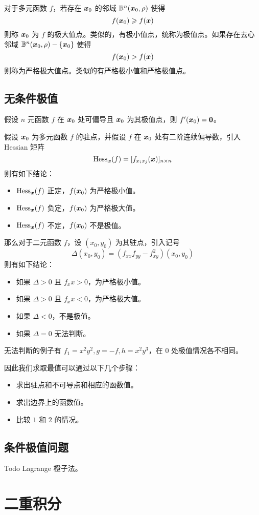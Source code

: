 对于多元函数 $f$，若存在 $\boldsymbol{x}_0$ 的邻域 $\mathbb{B}^n(\boldsymbol{x}_0, \rho)$ 使得
\[ f(\boldsymbol{x}_0) \geqslant f(\boldsymbol{x}) \]
则称 $\boldsymbol{x}_0$ 为 $f$ 的极大值点。类似的，有极小值点，统称为极值点。如果存在去心邻域 $\mathbb{B}^n(\boldsymbol{x}_0, \rho) - \{\boldsymbol{x}_0\}$ 使得
\[ f(\boldsymbol{x}_0) > f(\boldsymbol{x}) \]
则称为严格极大值点。类似的有严格极小值和严格极值点。

\subsection{无条件极值}

\begin{theorem}
	假设 $n$ 元函数 $f$ 在 $\boldsymbol{x}_0$ 处可偏导且 $\boldsymbol{x}_0$ 为其极值点，则 $f'(\boldsymbol{x}_0) = \boldsymbol{0}$。
\end{theorem}

\begin{theorem}
	假设 $\boldsymbol{x}_0$ 为多元函数 $f$ 的驻点，并假设 $f$ 在 $\boldsymbol{x}_0$ 处有二阶连续偏导数，引入 Hessian 矩阵
	\[ \operatorname{Hess}_{\boldsymbol{x}}(f) = [f_{x_i x_j}(\boldsymbol{x})]_{n \times n} \]
	则有如下结论：
	\begin{itemize}
		\item $\operatorname{Hess}_{\boldsymbol{x}}(f)$ 正定，$f(\boldsymbol{x}_0)$ 为严格极小值。
		\item $\operatorname{Hess}_{\boldsymbol{x}}(f)$ 负定，$f(\boldsymbol{x}_0)$ 为严格极大值。
		\item $\operatorname{Hess}_{\boldsymbol{x}}(f)$ 不定，$f(\boldsymbol{x}_0)$ 不是极值。
	\end{itemize}
\end{theorem}

那么对于二元函数 $f$，设 $(x_0, y_0)$ 为其驻点，引入记号
\[ \Delta(x_0, y_0) = (f_{xx} f_{yy} - f_{xy}^2)(x_0, y_0) \]
则有如下结论：
\begin{itemize}
	\item 如果 $\Delta > 0$ 且 $f_xx > 0$，为严格极小值。
	\item 如果 $\Delta > 0$ 且 $f_xx < 0$，为严格极大值。
	\item 如果 $\Delta < 0$，不是极值。
	\item 如果 $\Delta = 0$ 无法判断。
\end{itemize}

无法判断的例子有 $f_1 = x^2y^2, g = -f, h = x^2 y^3$，在 $0$ 处极值情况各不相同。

因此我们求取最值可以通过以下几个步骤：

\begin{itemize}
	\item 求出驻点和不可导点和相应的函数值。
	\item 求出边界上的函数值。
	\item 比较 $1$ 和 $2$ 的情况。
\end{itemize}

\subsection{条件极值问题}

Todo Lagrange 橙子法。

\section{二重积分}


